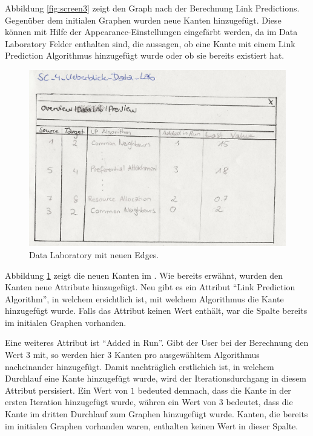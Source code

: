 Abbildung \ref{fig:screen3} zeigt den Graph nach der Berechnung Link Predictions.
Gegenüber dem initialen Graphen wurden neue Kanten hinzugefügt.
Diese können mit Hilfe der Appearance-Einstellungen eingefärbt werden, da im Data Laboratory Felder enthalten sind, die aussagen, ob eine
Kante mit einem Link Prediction Algorithmus hinzugefügt wurde oder ob sie bereits existiert hat.

\begin{figure}
    \includegraphics[width=\linewidth]{resources/SC-4.png}
    \caption{Data Laboratory mit neuen Edges.}
    \label{fig:screen4}
\end{figure}

Abbildung \ref{fig:screen4} zeigt die neuen Kanten im .
Wie bereits erwähnt, wurden den Kanten neue Attribute hinzugefügt.
Neu gibt es ein Attribut ``Link Prediction Algorithm'', in welchem ersichtlich ist, mit welchem Algorithmus die Kante hinzugefügt wurde.
Falls das Attribut keinen Wert enthält, war die Spalte bereits im initialen Graphen vorhanden.

Eine weiteres Attribut ist ``Added in Run''. Gibt der User bei der Berechnung den Wert $3$ mit, so werden hier 3 Kanten pro
ausgewähltem Algorithmus nacheinander hinzugefügt. Damit nachträglich erstlichich ist, in welchem Durchlauf eine
Kante hinzugefügt wurde, wird der Iterationsdurchgang in diesem Attribut persisiert.
Ein Wert von $1$ bedeuted demnach, dass die Kante in der ersten Iteration hinzugefügt wurde, währen ein Wert von $3$ bedeutet, dass die Kante im dritten Durchlauf zum Graphen hinzugefügt wurde.
Kanten, die bereits im initialen Graphen vorhanden waren, enthalten keinen Wert in dieser Spalte.

